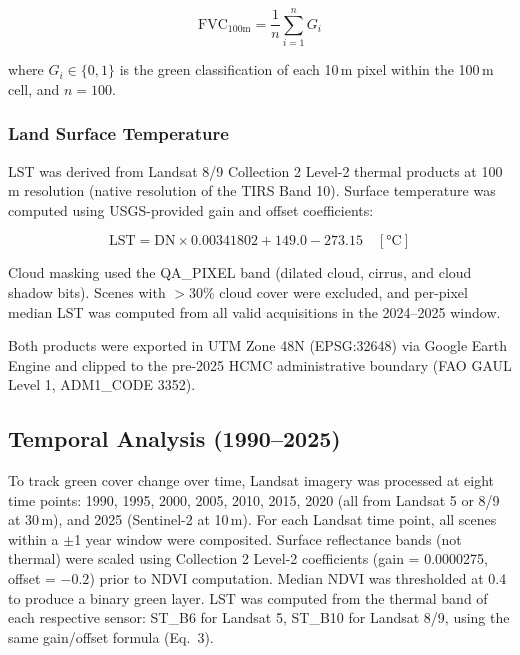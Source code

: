 \documentclass[preprint,12pt]{elsarticle}
\begin{document}
\begin{equation}
    \text{FVC}_{100\text{m}} = \frac{1}{n} \sum_{i=1}^{n} G_i
\end{equation}

\noindent where $G_i \in \{0, 1\}$ is the green classification of each 10\,m pixel within the 100\,m cell, and $n = 100$.

\subsubsection{Land Surface Temperature}

LST was derived from Landsat 8/9 Collection 2 Level-2 thermal products at 100\,m resolution (native resolution of the TIRS Band 10). Surface temperature was computed using USGS-provided gain and offset coefficients:

\begin{equation}
    \text{LST} = \text{DN} \times 0.00341802 + 149.0 - 273.15 \quad [\si{\degreeCelsius}]
\end{equation}

\noindent Cloud masking used the QA\_PIXEL band (dilated cloud, cirrus, and cloud shadow bits). Scenes with $>30$\% cloud cover were excluded, and per-pixel median LST was computed from all valid acquisitions in the 2024--2025 window.

Both products were exported in UTM Zone 48N (EPSG:32648) via Google Earth Engine \citep{gorelick2017} and clipped to the pre-2025 HCMC administrative boundary (FAO GAUL Level 1, ADM1\_CODE 3352).

\subsection{Temporal Analysis (1990--2025)}
\label{sec:temporal_methods}

To track green cover change over time, Landsat imagery was processed at eight time points: 1990, 1995, 2000, 2005, 2010, 2015, 2020 (all from Landsat 5 or 8/9 at 30\,m), and 2025 (Sentinel-2 at 10\,m). For each Landsat time point, all scenes within a $\pm$1 year window were composited. Surface reflectance bands (not thermal) were scaled using Collection 2 Level-2 coefficients (gain = 0.0000275, offset = $-0.2$) prior to NDVI computation. Median NDVI was thresholded at 0.4 to produce a binary green layer. LST was computed from the thermal band of each respective sensor: ST\_B6 for Landsat 5, ST\_B10 for Landsat 8/9, using the same gain/offset formula (Eq.~3).
\end{document}
